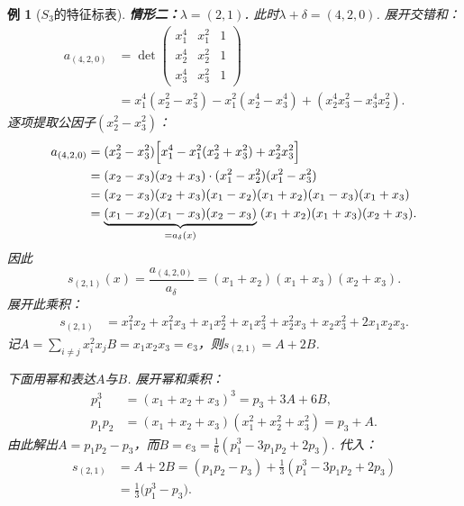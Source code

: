 \documentclass{sjtureport}
\newtheorem{example}{例}[chapter]
\begin{document}
\begin{example}[$S_3$的特征标表]
\medskip
\noindent\textbf{情形二：$\lambda=(2,1)$. }\quad
此时$\lambda+\delta=(4,2,0)$. 展开交错和：
\begin{align*}
    a_{(4,2,0)}&= \det\begin{pmatrix}
        x_1^4 & x_1^2 & 1\\
        x_2^4 & x_2^2 & 1\\
        x_3^4 & x_3^2 & 1
    \end{pmatrix} \\
    &=x_1^4(x_2^2-x_3^2)-x_1^2(x_2^4-x_3^4)+(x_2^4x_3^2-x_3^4x_2^2).
\end{align*}
逐项提取公因子$(x_2^2-x_3^2)$：
\begin{align*}
    a_{(4,2,0)}&=(x_2^2-x_3^2)\Bigl[x_1^4-x_1^2(x_2^2+x_3^2)+x_2^2x_3^2\Bigr]\\
    &=(x_2-x_3)(x_2+x_3)\cdot(x_1^2-x_2^2)(x_1^2-x_3^2)\\
    &=(x_2-x_3)(x_2+x_3)(x_1-x_2)(x_1+x_2)(x_1-x_3)(x_1+x_3)\\
    &=\underbrace{(x_1-x_2)(x_1-x_3)(x_2-x_3)}_{=a_\delta(x)}\;
      (x_1+x_2)(x_1+x_3)(x_2+x_3).
\end{align*}
因此
\begin{equation}\label{eq:S3-s21}
    s_{(2,1)}(x)=\frac{a_{(4,2,0)}}{a_\delta}=(x_1+x_2)(x_1+x_3)(x_2+x_3).
\end{equation}
展开此乘积：
\begin{align*}
    s_{(2,1)}&=x_1^2x_2+x_1^2x_3+x_1x_2^2+x_1x_3^2+x_2^2x_3+x_2x_3^2+2x_1x_2x_3.
\end{align*}
记$A=\sum_{i\neq j}x_i^2x_j$$B=x_1x_2x_3=e_3$，则$s_{(2,1)}=A+2B$. 

下面用幂和表达$A$与$B$. 展开幂和乘积：
\begin{align*}
    p_1^3&=(x_1+x_2+x_3)^3=p_3+3A+6B,\\
    p_1p_2&=(x_1+x_2+x_3)(x_1^2+x_2^2+x_3^2)=p_3+A.
\end{align*}
由此解出$A=p_1p_2-p_3$，而$B=e_3=\frac{1}{6}(p_1^3-3p_1p_2+2p_3)$. 代入：
\begin{align*}
    s_{(2,1)}&=A+2B=(p_1p_2-p_3)+\frac{1}{3}(p_1^3-3p_1p_2+2p_3)\\
    &=\frac{1}{3}\bigl(p_1^3-p_3\bigr).
\end{align*}


\end{example}
\end{document}
